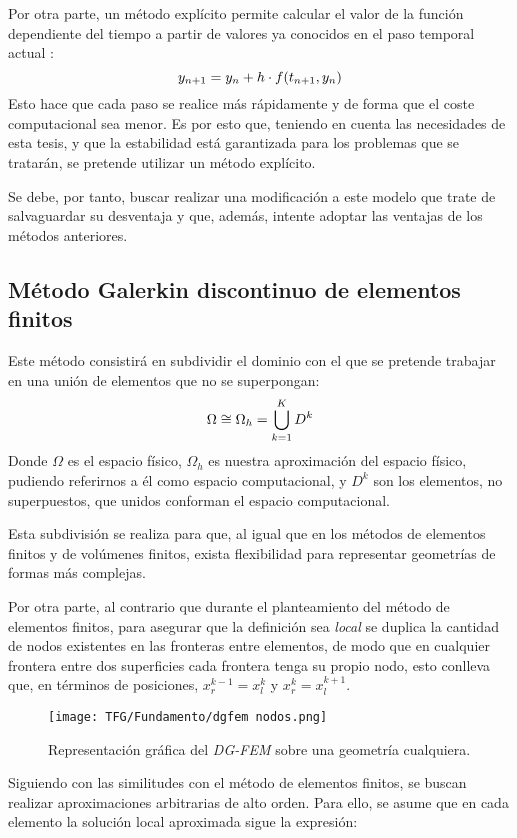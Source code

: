\documentclass[11pt,a4paper,twoside,pdf]{article}
\numberwithin{equation}{section}
\begin{document}
Por otra parte, un método explícito permite calcular el valor de la función dependiente del tiempo a partir de valores ya conocidos en el paso temporal actual \cite{explicitorimplicit}:
\begin{equation}
    y_{n+1}=y_n+h\cdot f(t_{n+1},y_{n}) \notag
\end{equation}
Esto hace que cada paso se realice más rápidamente y de forma que el coste computacional sea menor. Es por esto que, teniendo en cuenta las necesidades de esta tesis, y que la estabilidad está garantizada para los problemas que se tratarán, se pretende utilizar un método explícito.


Se debe, por tanto, buscar realizar una modificación a este modelo que trate de salvaguardar su desventaja y que, además, intente adoptar las ventajas de los métodos anteriores.
\subsection{Método Galerkin discontinuo de elementos finitos}
Este método consistirá en subdividir el dominio con el que se pretende trabajar en una unión de elementos que no se superpongan:
\begin{equation}
   \Omega\cong\Omega_h=\bigcup_{k=1}^{K}D^k  \notag
\end{equation}
Donde $\Omega$ es el espacio físico, $\Omega_h$ es nuestra aproximación del espacio físico, pudiendo referirnos a él como espacio computacional, y $D^k$ son los elementos, no superpuestos, que unidos conforman el espacio computacional.

Esta subdivisión se realiza para que, al igual que en los métodos de elementos finitos y de volúmenes finitos, exista flexibilidad para representar geometrías de formas más complejas. 

Por otra parte, al contrario que durante el planteamiento del método de elementos finitos, para asegurar que la definición sea \textit{local} se duplica la cantidad de nodos existentes en las fronteras entre elementos, de modo que en cualquier frontera entre dos superficies cada frontera tenga su propio nodo, esto conlleva que, en términos de posiciones, $x_r^{k-1}=x_l^{k}$ y $x_r^{k}=x_l^{k+1}$.
\begin{figure}[h]
\centering
\texttt{[image: TFG/Fundamento/dgfem nodos.png]}				
\caption{Representación gráfica del \textit{DG-FEM} sobre una geometría cualquiera.}
\end{figure}
\noindent

Siguiendo con las similitudes con el método de elementos finitos, se buscan realizar aproximaciones arbitrarias de alto orden. Para ello, se asume que en cada elemento la solución local aproximada sigue la expresión:
\end{document}
